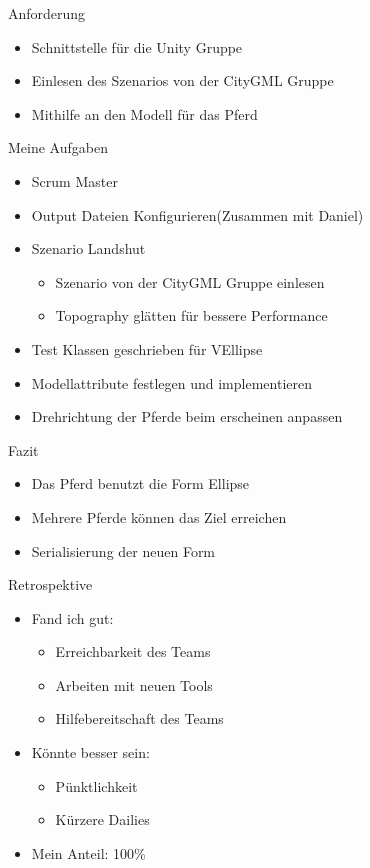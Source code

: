 \begin{frame}{Anforderung}
	\begin{itemize}
		\item Schnittstelle für die Unity Gruppe
		\item Einlesen des Szenarios von der CityGML Gruppe
		\item Mithilfe an den Modell für das Pferd
	\end{itemize}
\end{frame}

\begin{frame}{Meine Aufgaben}
	\begin{itemize}
		\item Scrum Master
		\item Output Dateien Konfigurieren(Zusammen mit Daniel)
		\item Szenario Landshut
		\begin{itemize}
			\item Szenario von der CityGML Gruppe einlesen
			\item Topography glätten für bessere Performance
		\end{itemize}
		\item Test Klassen geschrieben für VEllipse
		\item Modellattribute festlegen und implementieren
		\item Drehrichtung der Pferde beim erscheinen anpassen
	\end{itemize}
\end{frame}

\begin{frame}{Fazit}
	\begin{itemize}
		\item Das Pferd benutzt die Form Ellipse 
		\item Mehrere Pferde können das Ziel erreichen
		\item Serialisierung der neuen Form
	\end{itemize}
\end{frame}

\begin{frame}{Retrospektive}
	\begin{itemize}
		\item{Fand ich gut:}
		\begin{itemize}
			\item{Erreichbarkeit des Teams}
			\item{Arbeiten mit neuen Tools}
			\item{Hilfebereitschaft des Teams}
		\end{itemize}
		\item{Könnte besser sein:}
		\begin{itemize}
			\item{Pünktlichkeit}
			\item{Kürzere Dailies}
		\end{itemize}
		\item{Mein Anteil: 100\%}
	\end{itemize}
\end{frame}